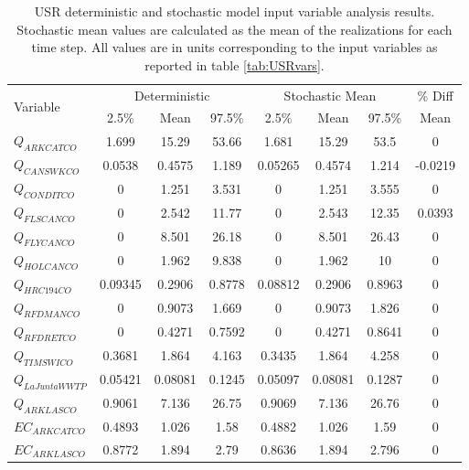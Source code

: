 \begin{linenumbers}
\begin{table}[htbp]
\centering
\caption[USR deterministic and stochastic model input variable analysis results.]{USR deterministic and stochastic model input variable analysis results.  Stochastic mean values are calculated as the mean of the realizations for each time step.  All values are in units corresponding to the input variables as reported in table \ref{tab:USRvars}.}
\label{tab:USRVarResults}
    \begin{tabular}{l|ccc|ccc|c}
    \toprule
    \multirow{2}[0]{*}{Variable} & \multicolumn{3}{c}{Deterministic} & \multicolumn{3}{c}{Stochastic Mean} & \% Diff\\\cline{2-4} \cline{5-7}
    & 2.5\% & Mean & 97.5\% & 2.5\% & Mean & 97.5\% & Mean\\
    \midrule
    \midrule
	$Q_{ARKCATCO}$&		1.699&	15.29&	53.66&	1.681&	15.29&	53.5&	0\\                            
	$Q_{CANSWKCO}$&		0.0538&	0.4575&	1.189&	0.05265&	0.4574&	1.214&	-0.0219\\                  
	$Q_{CONDITCO}$&		0&	1.251&	3.531&	0&	1.251&	3.555&	0\\                                    
	$Q_{FLSCANCO}$&		0&	2.542&	11.77&	0&	2.543&	12.35&	0.0393\\                               
	$Q_{FLYCANCO}$&		0&	8.501&	26.18&	0&	8.501&	26.43&	0\\                                    
	$Q_{HOLCANCO}$&		0&	1.962&	9.838&	0&	1.962&	10&	0\\                                        
	$Q_{HRC194CO}$&		0.09345&	0.2906&	0.8778&	0.08812&	0.2906&	0.8963&	0\\                    
	$Q_{RFDMANCO}$&		0&	0.9073&	1.669&	0&	0.9073&	1.826&	0\\                                    
	$Q_{RFDRETCO}$&		0&	0.4271&	0.7592&	0&	0.4271&	0.8641&	0\\                                    
	$Q_{TIMSWICO}$&		0.3681&	1.864&	4.163&	0.3435&	1.864&	4.258&	0\\                            
	$Q_{La Junta WWTP}$&0.05421&	0.08081&	0.1245&	0.05097&	0.08081&	0.1287&	0\\            
	$Q_{ARKLASCO}$&		0.9061&	7.136&	26.75&	0.9069&	7.136&	26.76&	0\\                            
	$EC_{ARKCATCO}$&	0.4893&	1.026&	1.58&	0.4882&	1.026&	1.59&	0\\                            
	$EC_{ARKLASCO}$&	0.8772&	1.894&	2.79&	0.8636&	1.894&	2.796&	0\\                            

\end{tabular}
\end{table}
\end{linenumbers}
